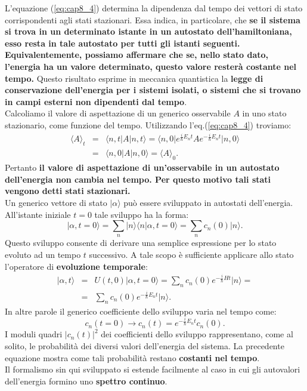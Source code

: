 L'equazione (\ref{eq:cap8_4}) determina la dipendenza dal tempo dei vettori di stato corrispondenti agli stati stazionari. Essa indica, in particolare, che \textbf{se il sistema si trova in un determinato istante in un autostato dell'hamiltoniana, esso resta in tale autostato per tutti gli istanti seguenti. Equivalentemente, possiamo affermare che se, nello stato dato, l'energia ha un valore determinato, questo valore resterà costante nel tempo.} Questo risultato esprime in meccanica quantistica la \textbf{legge di conservazione dell'energia per i sistemi isolati, o sistemi che si trovano in campi esterni non dipendenti dal tempo}.\\
Calcoliamo il valore di aspettazione di un generico osservabile $A$ in uno stato stazionario, come funzione del tempo. Utilizzando l'eq.(\ref{eq:cap8_4}) troviamo:
\begin{eqnarray}
\langle A \rangle _t &=& \langle n, t \vert A \vert n, t \rangle= \langle n, 0 \vert e^{\frac{i}{\hbar}E_n t}A e^{-\frac{i}{\hbar}E_n t}\vert n, 0 \rangle \nonumber \\
& = &\langle n, 0 \vert A \vert n, 0 \rangle = \langle A \rangle _0.
\end{eqnarray}
Pertanto \textbf{il valore di aspettazione di un'osservabile in un autostato dell'energia non cambia nel tempo. Per questo motivo tali stati vengono detti stati stazionari.}\\
Un generico vettore di stato $\vert \alpha \rangle $ può essere sviluppato in autostati dell'energia. All'istante iniziale $t=0$ tale sviluppo ha la forma:
\begin{equation}
\vert \alpha , t=0\rangle = \sum _n \vert n \rangle \langle n \vert \alpha, t=0 \rangle = \sum _n c_n(0)\vert n \rangle.
\end{equation}
Questo sviluppo consente di derivare una semplice espressione per lo stato evoluto ad un tempo $t$ successivo. A tale scopo è sufficiente applicare allo stato l'operatore di \textbf{evoluzione temporale}:
\begin{eqnarray}
\vert \alpha, t \rangle &=& U (t,0)\vert \alpha, t=0 \rangle = \sum _n c_n (0) e^{-\frac{i}{\hbar}H t}  \vert n \rangle = \nonumber \\
& = &\sum _n c_n (0) e^{-\frac{i}{\hbar}E_n t}  \vert n \rangle.
\end{eqnarray}
In altre parole il generico coefficiente dello sviluppo varia nel tempo come:
\begin{equation}
c_n (t=0) \rightarrow c_n(t)=e^{-\frac{i}{\hbar}E_n t} c_n (0).
\end{equation}
I moduli quadri $\vert c_n(t)\vert^2$ dei coefficienti dello sviluppo rappresentano, come al solito, le probabilità dei diversi valori dell'energia del sistema. La precedente equazione mostra come tali probabilità restano \textbf{costanti nel tempo}.\\
Il formalismo sin qui sviluppato si estende facilmente al caso in cui gli autovalori dell'energia formino uno \textbf{spettro continuo}.

